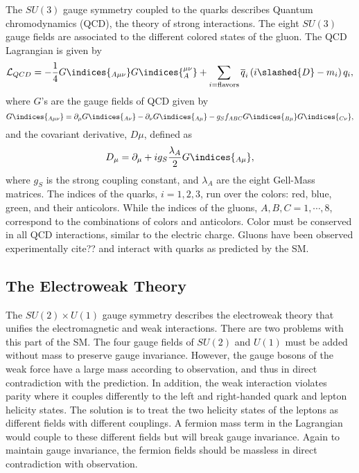 The $ SU\left(3\right) $ gauge symmetry coupled to the quarks describes Quantum chromodynamics (QCD), the theory of strong interactions.
The eight $ SU\left(3\right) $ gauge fields are associated to the different colored states of the gluon.
The QCD Lagrangian is given by
\begin{equation}
\mathcal{L}_{QCD} = -\frac{1}{4} G\indices{_{A\mu\nu}}G\indices{_{A}^{\mu\nu}} + \sum_{i=\text{flavors}} \overline{q}_i \left(i\slashed{D} - m_i\right) q_i,
\end{equation}
where $G$'s are the gauge fields of QCD given by 
\begin{equation}
G\indices{_{A\mu\nu}} = \partial_{\mu} G\indices{_{A\nu}} - \partial_{\nu} G\indices{_{A\mu}} - g_S f_{ABC} G\indices{_{B\mu}} G\indices{_{C\nu}},
\end{equation}
and the covariant derivative, $D\mu$,  defined as
\begin{equation}
D_\mu = \partial_{\mu} + i g_S \frac{\lambda_A}{2}G\indices{_{A\mu}},
\end{equation}
where $g_S$ is the strong coupling constant, and $\lambda_A$ are the eight Gell-Mass matrices.
The indices of the quarks, $i=1,2,3$, run over the colors: red, blue, green, and their anticolors.
While the indices of the gluons, $A,B,C = 1, \cdots, 8$, correspond to the combinations of colors and anticolors.
Color must be conserved in all QCD interactions, similar to the  electric charge.
Gluons have been observed experimentally cite?? and interact with quarks as predicted by the SM.

\subsection{The Electroweak Theory}

The $ SU\left(2\right) \times U\left(1\right) $ gauge symmetry describes the
electroweak theory that unifies the electromagnetic and weak interactions.
There are two problems with this part of the SM.
The four gauge fields of $ SU\left(2\right) $ and $ U\left(1\right) $ 
must be added without mass to preserve gauge invariance.
However, the gauge bosons of the weak force have a large mass according to observation,
and thus in direct contradiction with the prediction.
In addition, the weak interaction violates parity where it couples differently 
to the left and right-handed quark and lepton helicity states.
The solution is to treat the two helicity states of the leptons as different fields
with different couplings. A fermion mass term in the Lagrangian would couple to 
these different fields but will break gauge invariance.
Again to maintain gauge invariance, the fermion fields should be massless in 
direct contradiction with observation.


